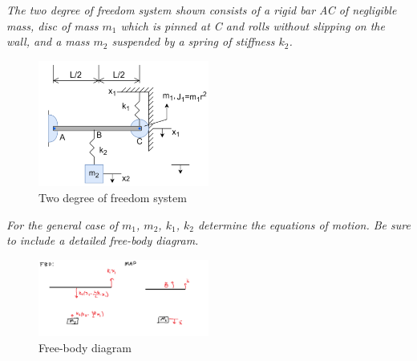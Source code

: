 \section{}

\textit{The two degree of freedom system shown consists of a rigid bar AC of negligible mass, disc of mass $m_1$ which is pinned at C and rolls without slipping on the wall, and a mass $m_2$ suspended by a spring of stiffness $k_2$.}
\begin{figure}[H]
    \centering
    \includegraphics[width=0.5\textwidth]{Questions/Figures/Q5 Problem Diagram.png}
    \caption{Two degree of freedom system}
\end{figure}

\textit{For the general case of $m_1$, $m_2$, $k_1$, $k_2$ determine the equations of motion. Be sure to include a detailed free-body diagram.}
\begin{figure}[H]
    \centering
    \includegraphics[width=0.5\textwidth]{Questions/Figures/Q5 FBD.png}
    \caption{Free-body diagram}
\end{figure}

